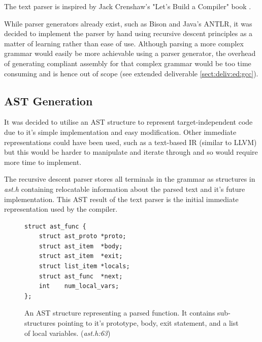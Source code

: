 \documentclass[11pt,a4paper]{report}
\begin{document}
The text parser is inspired by Jack Crenshaw's "Let's Build a Compiler" book \cite{crenshaw1988let}.

While parser generators already exist, such as Bison and Java's ANTLR, it was decided to implement the parser by hand using recursive descent principles as a matter of learning rather than ease of use. Although parsing a more complex grammar would easily be more achievable using a parser generator, the overhead of generating compliant assembly for that complex grammar would be too time consuming and is hence out of scope (see extended deliverable \ref{sect:deliv:ed:gcc}).

\subsection{AST Generation}
\label{sect:compiler_ast}
It was decided to utilise an AST structure to represent target-independent code due to it's simple implementation and easy modification. Other immediate representations could have been used, such as a text-based IR (similar to LLVM) but this would be harder to manipulate and iterate through and so would require more time to implement.

The recursive descent parser stores all terminals in the grammar as structures in \textit{ast.h} containing relocatable information about the parsed text and it's future implementation. This AST result of the text parser is the initial immediate representation used by the compiler.

\begin{figure}[H]
\centering 
\begin{minipage}{0.4\textwidth}
\begin{verbatim}
struct ast_func {
    struct ast_proto *proto;
    struct ast_item  *body;
    struct ast_item  *exit;
    struct list_item *locals;
    struct ast_func  *next;
    int    num_local_vars;
};
\end{verbatim}
\end{minipage}
\caption{An AST structure representing a parsed function. It contains sub-structures pointing to it's prototype, body, exit statement, and a list of local variables. (\textit{ast.h:63})}
\end{figure}
\end{document}
